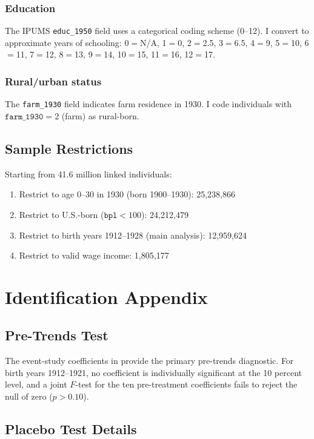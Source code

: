 \documentclass[12pt]{article}
\begin{document}
\subsubsection*{Education} The IPUMS \texttt{educ\_1950} field uses a categorical coding scheme (0--12). I convert to approximate years of schooling: 0$=$N/A, 1$=$0, 2$=$2.5, 3$=$6.5, 4$=$9, 5$=$10, 6$=$11, 7$=$12, 8$=$13, 9$=$14, 10$=$15, 11$=$16, 12$=$17.

\subsubsection*{Rural/urban status} The \texttt{farm\_1930} field indicates farm residence in 1930. I code individuals with $\texttt{farm\_1930} = 2$ (farm) as rural-born.

\subsection{Sample Restrictions}

Starting from 41.6 million linked individuals:
\begin{enumerate}
\item Restrict to age 0--30 in 1930 (born 1900--1930): 25,238,866
\item Restrict to U.S.-born ($\texttt{bpl} < 100$): 24,212,479
\item Restrict to birth years 1912--1928 (main analysis): 12,959,624
\item Restrict to valid wage income: 1,805,177
\end{enumerate}

\section{Identification Appendix}
\label{app:id}

\subsection{Pre-Trends Test}

The event-study coefficients in  provide the primary pre-trends diagnostic. For birth years 1912--1921, no coefficient is individually significant at the 10 percent level, and a joint $F$-test for the ten pre-treatment coefficients fails to reject the null of zero ($p > 0.10$).

\subsection{Placebo Test Details}
\end{document}
